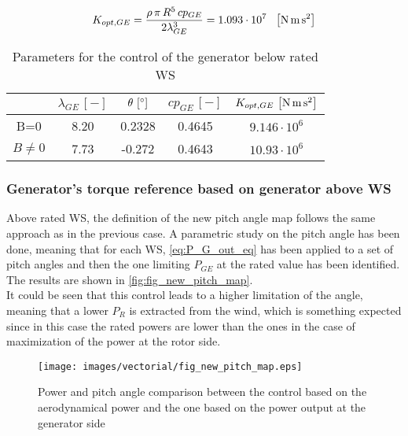 \begin{equation}
  K_{opt,GE} = \frac{\rho \, \pi \, R^5 \, cp_{GE}}{2\lambda_{GE}^3} = 1.093\cdot10^7 \ \ \mesunt{\newton\meter\square\second}
  \label{eq:K_opt_GE}
\end{equation}

\begin{table}[htb]
  \centering
  \caption{Parameters for the control of the generator below rated WS}
  \begin{tabular}{ccccc}
    \toprule
    & $\lambda_{GE} \, \left[-\right]$ & $\theta \, \left[\si{\degree}\right]$ & $cp_{GE} \, \left[-\right]$ & $K_{opt,GE} \, \left[\si{\newton\meter\square\second}\right]$ \\ \midrule
    B=0 & 8.20 & 0.2328 & 0.4645 & $9.146 \cdot 10^6$\\
    $B\ne0$ & 7.73 & -0.272 & 0.4643 & $10.93 \cdot 10^6$\\ \bottomrule
  \end{tabular}
  \label{tab:tab_k_opt_GE}
\end{table}

\subsubsection[Above rated WS]{Generator's torque reference based on generator above WS}
Above rated WS, the definition of the new pitch angle map follows the same approach as in the previous case. A parametric study on the pitch angle has been done, meaning that for each WS, \autoref{eq:P_G_out_eq} has been applied to a set of pitch angles and then the one limiting $P_{GE}$ at the rated value has been identified. The results are shown in \autoref{fig:fig_new_pitch_map}.\\ 
 It could be seen that this control leads to a higher limitation of the angle, meaning that a lower $P_R$ is extracted from the wind, which is something expected since in this case the rated powers are lower than the ones in the case of maximization of the power at the rotor side.
\begin{figure}[H]
  \centering
  \texttt{[image: images/vectorial/fig\_new\_pitch\_map.eps]}
  \caption{Power and pitch angle comparison between the control based on the aerodynamical power and the one based on the power output at the generator side}
  \label{fig:fig_new_pitch_map}
\end{figure}

